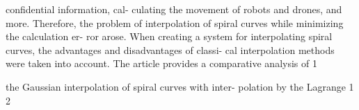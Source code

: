 \documentclass[12pt,a4paper]{article}
\begin{document}
confidential information, cal- culating the movement of robots and drones, and more. Therefore, the problem of interpolation of spiral curves while minimizing the calculation er- ror arose. When creating a system for interpolating spiral curves, the advantages and disadvantages of classi- cal interpolation methods were taken into account. The article provides a comparative analysis of 1
\par
the Gaussian interpolation of spiral curves with inter- polation by the Lagrange 1 2
\par
\end{document}
